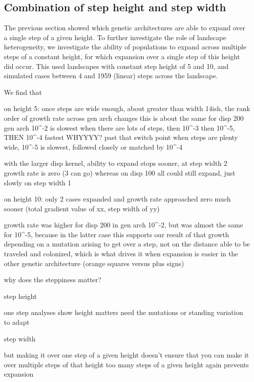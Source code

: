 \subsection{Combination of step height and step width}

The previous section showed which genetic architectures are able to expand over a single step of a given height. To further investigate the role of landscape heterogeneity, we investigate the ability of populations to expand across multiple steps of a constant height, for which expansion over a single step of this height did occur. This used landscapes with constant step height of 5 and 10, and simulated cases between 4 and 1959 (linear) steps across the landscape.

We find that 

on height 5:
once steps are wide enough, about greater than width 14ish, the rank order of growth rate across gen arch changes
this is about the same for disp 200
gen arch 10^-2 is slowest when there are lots of steps, then 10^-3 then 10^-5, THEN 10^-4 fastest WHYYYY?
past that switch point when steps are plenty wide, 10^-5 is slowest, followed closely or matched by 10^-4

with the larger disp kernel, ability to expand stops sooner, at step width 2 growth rate is zero (3 can go) whereas on disp 100 all could still expand, just slowly on step width 1


on height 10:
only 2 cases expanded and growth rate approached zero much sooner (total gradient value of xx, step width of yy)

growth rate was higher for disp 200 in gen arch 10^-2, but was almost the same for 10^-5, because in the latter case this supports our result of that growth depending on a mutation arising to get over a step, not on the distance able to be traveled and colonized, which is what drives it when expansion is easier in the other genetic architecture (orange squares versus plus signs)

why does the steppiness matter?

step height

	one step analyses show height matters
	need the mutations or standing variation to adapt


step width

	but making it over one step of a given height doesn't ensure that you can make it over multiple steps of that height
	too many steps of a given height again prevents expansion
	
